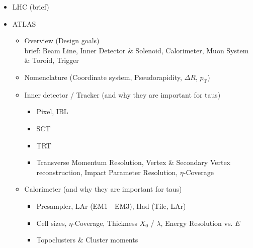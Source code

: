 \begin{itemize}
\item LHC (brief)

\item ATLAS
  \begin{itemize}
  \item Overview (Design goals) \\
    brief: Beam Line, Inner Detector \& Solenoid, Calorimeter, Muon System \&
    Toroid, Trigger

  \item Nomenclature (Coordinate system, Pseudorapidity, $\Delta R$,
    $p_\mathrm{T}$)

  \item Inner detector / Tracker (and why they are important for taus)
    \begin{itemize}
    \item Pixel, IBL
    \item SCT
    \item TRT
    \item  Transverse Momentum Resolution, Vertex \& Secondary Vertex
      reconstruction, Impact Parameter Resolution, $\eta$-Coverage
    \end{itemize}

  \item Calorimeter (and why they are important for taus)
    \begin{itemize}
    \item Presampler, LAr (EM1 - EM3), Had (Tile, LAr)
    \item Cell sizes, $\eta$-Coverage, Thickness $X_0$ / $\lambda$,
      Energy Resolution vs. $E$
    \item Topoclusters \& Cluster moments
    \end{itemize}

  \end{itemize}
\end{itemize}

